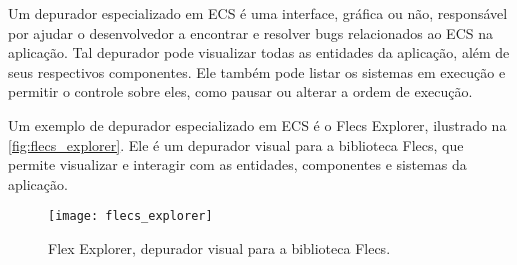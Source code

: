 Um depurador especializado em ECS é uma interface, gráfica ou não, responsável por ajudar o desenvolvedor a encontrar e resolver bugs relacionados ao ECS na aplicação. Tal depurador pode visualizar todas as entidades da aplicação, além  de seus respectivos componentes. Ele também pode listar os sistemas em execução e permitir o controle sobre eles, como pausar ou alterar a ordem de execução.

Um exemplo de depurador especializado em ECS é o Flecs Explorer, ilustrado na \autoref{fig:flecs_explorer}. Ele é um depurador visual para a biblioteca Flecs, que permite visualizar e interagir com as entidades, componentes e sistemas da aplicação.

\begin{figure}[H]
	\centering
	\texttt{[image: flecs\_explorer]}
	\caption{Flex Explorer, depurador visual para a biblioteca Flecs.}
	\label{fig:flecs_explorer}
\end{figure}
